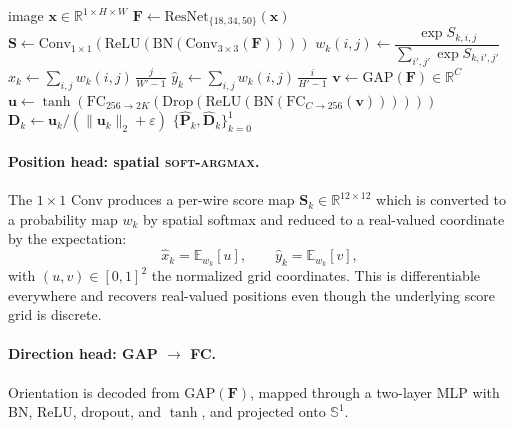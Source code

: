 \documentclass[conference,10pt,letterpaper]{IEEEtran}
\newcommand{\softargmax}{\textsc{soft-argmax}}
\begin{document}
\begin{algorithm}[t]
\caption{Hybrid-head forward pass}
\label{alg:forward}
\begin{algorithmic}[1]
\Require image $\mathbf{x}\in\mathbb{R}^{1\times H\times W}$
\State $\mathbf{F} \leftarrow \mathrm{ResNet}_{\{18,34,50\}}(\mathbf{x})$
\State $\mathbf{S} \leftarrow \mathrm{Conv}_{1\times 1}(\mathrm{ReLU}(\mathrm{BN}(\mathrm{Conv}_{3\times 3}(\mathbf{F}))))$
\State $w_k(i,j) \leftarrow \dfrac{\exp S_{k,i,j}}{\sum_{i',j'}\exp S_{k,i',j'}}$
\State $\hat{x}_k \leftarrow \sum_{i,j} w_k(i,j)\,\tfrac{j}{W'-1}$
\State $\hat{y}_k \leftarrow \sum_{i,j} w_k(i,j)\,\tfrac{i}{H'-1}$
       \Comment{\softargmax}
\EndFor
\State $\mathbf{v} \leftarrow \mathrm{GAP}(\mathbf{F})\in\mathbb{R}^{C}$
\State $\mathbf{u} \leftarrow \tanh(\mathrm{FC}_{256\to 2K}(\mathrm{Drop}(\mathrm{ReLU}(\mathrm{BN}(\mathrm{FC}_{C\to 256}(\mathbf{v}))))))$
\State $\mathbf{D}_k \leftarrow \mathbf{u}_k / (\|\mathbf{u}_k\|_2+\varepsilon)$
\State \Return $\{\hat{\mathbf{P}}_k,\hat{\mathbf{D}}_k\}_{k=0}^{1}$
\end{algorithmic}
\end{algorithm}

\paragraph{Position head: spatial \softargmax.}
The $1{\times}1$ Conv produces a per-wire score map
$\mathbf{S}_k\in\mathbb{R}^{12\times 12}$ which is converted to a
probability map $w_k$ by spatial softmax and reduced to a real-valued
coordinate by the expectation:
\begin{equation}
\label{eq:softargmax}
  \hat{x}_k = \mathbb{E}_{w_k}[u],\qquad
  \hat{y}_k = \mathbb{E}_{w_k}[v],
\end{equation}
with $(u,v)\in[0,1]^2$ the normalized grid coordinates. This is
differentiable everywhere and recovers real-valued positions even though
the underlying score grid is discrete.

\paragraph{Direction head: GAP $\to$ FC.}
Orientation is decoded from $\mathrm{GAP}(\mathbf{F})$, mapped through a
two-layer MLP with BN, ReLU, dropout, and $\tanh{}$, and projected onto
$\mathbb{S}^1$.
\end{document}
